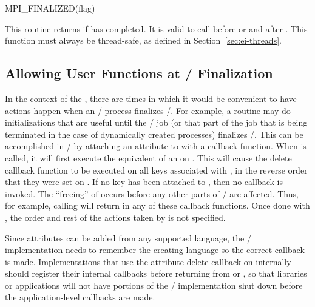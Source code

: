 \begin{funcdef}{MPI\_FINALIZED}{(\mbox{flag})}
\end{funcdef}

This routine returns  if  has completed.
It is valid to call 
before  or  and after .
This function must always be thread-safe, as defined in
Section~\ref{sec:ei-threads}.

\subsection{Allowing User Functions at \texorpdfstring{\mpi/}{MPI} Finalization}
\label{subsec:inquiry-startup-userfunc}

In the context of the \wpm{}, there are times in which it would be convenient to have actions happen
when an \mpi/ process finalizes \MPI/.  For example, a routine may do
initializations that are useful until the \mpi/ job (or that part
of the job that is being terminated in the case of dynamically created
processes) finalizes \MPI/.  This can be accomplished in \mpi/ by
attaching an attribute to  with a callback
function.  When 
is called, it will first execute the equivalent of an
 on .
This will
cause the delete callback function to be executed on all keys
associated with , in the reverse order that
they were set on .  If no key has been
attached to , then no callback is invoked.
The ``freeing'' of  occurs before any other parts
of \MPI/ are affected.  Thus, for example, calling
 will return  in any of these
callback functions.  Once done with , the
order and rest of the actions taken by 
is not specified.

\begin{implementors}
Since attributes can be added from any supported language, the \mpi/
implementation needs to remember the creating language so the correct
callback is made.
Implementations that use the attribute delete callback on 
internally should register their internal callbacks before returning from
 or , so that libraries
or applications will not have portions of the \MPI/ implementation shut
down before the application-level callbacks are made.
\end{implementors}

